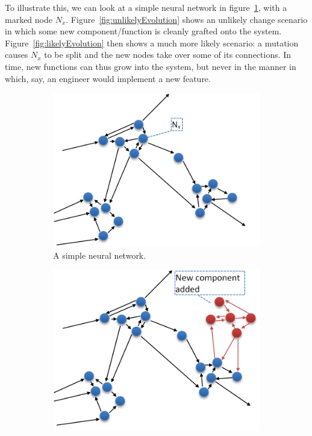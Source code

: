 \documentclass[]{scrartcl}
\begin{document}
To illustrate this, we can look at a simple neural network in figure~\ref{fig:neuralNetwork}, with a marked node $N_x$. Figure~\ref{fig:unlikelyEvolution} shows an unlikely change scenario in which some new component/function is cleanly grafted onto the system. Figure~\ref{fig:likelyEvolution} then shows a much more likely scenario: a mutation causes $N_x$ to be split and the new nodes take over some of its connections. In time, new functions can thus grow into the system, but never in the manner in which, say, an engineer would implement a new feature.

\begin{figure}
	\centering
	\begin{subfigure}[t]{0.45\textwidth}
		\includegraphics[width=\textwidth]{figs/neuralNetwork.png}
		\caption{A simple neural network.}
		\label{fig:neuralNetwork}
	\end{subfigure}
	\begin{subfigure}[t]{0.45\textwidth}
		\includegraphics[width=\textwidth]{figs/unlikelyEvolution.png}

\end{subfigure}
\end{figure}
\end{document}
